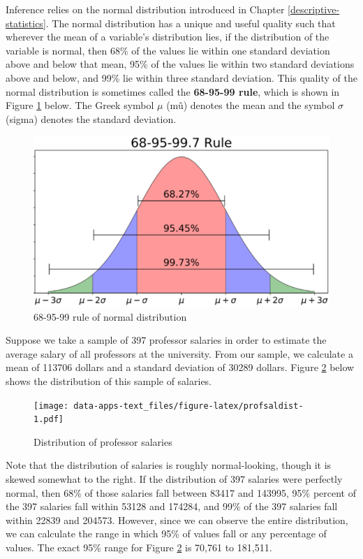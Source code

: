 \documentclass[
]{book}
\begin{document}
Inference relies on the normal distribution introduced in Chapter \ref{descriptive-statistics}. The normal distribution has a unique and useful quality such that wherever the mean of a variable's distribution lies, if the distribution of the variable is normal, then 68\% of the values lie within one standard deviation above and below that mean, 95\% of the values lie within two standard deviations above and below, and 99\% lie within three standard deviation. This quality of the normal distribution is sometimes called the \textbf{68-95-99 rule}, which is shown in Figure \ref{fig:normdist} below. The Greek symbol \(\mu\) (mû) denotes the mean and the symbol \(\sigma\) (sigma) denotes the standard deviation.

\begin{figure}
\includegraphics[width=9.56in]{images/normdist} \caption{68-95-99 rule of normal distribution}\label{fig:normdist}
\end{figure}

Suppose we take a sample of 397 professor salaries in order to estimate the average salary of all professors at the university. From our sample, we calculate a mean of 113706 dollars and a standard deviation of 30289 dollars. Figure \ref{fig:profsaldist} below shows the distribution of this sample of salaries.

\begin{figure}
\centering
\texttt{[image: data-apps-text\_files/figure-latex/profsaldist-1.pdf]}
\caption{\label{fig:profsaldist}Distribution of professor salaries}
\end{figure}

Note that the distribution of salaries is roughly normal-looking, though it is skewed somewhat to the right. If the distribution of 397 salaries were perfectly normal, then 68\% of those salaries fall between 83417 and 143995, 95\% percent of the 397 salaries fall within 53128 and 174284, and 99\% of the 397 salaries fall within 22839 and 204573. However, since we can observe the entire distribution, we can calculate the range in which 95\% of values fall or any percentage of values. The exact 95\% range for Figure \ref{fig:profsaldist} is 70,761 to 181,511.
\end{document}
